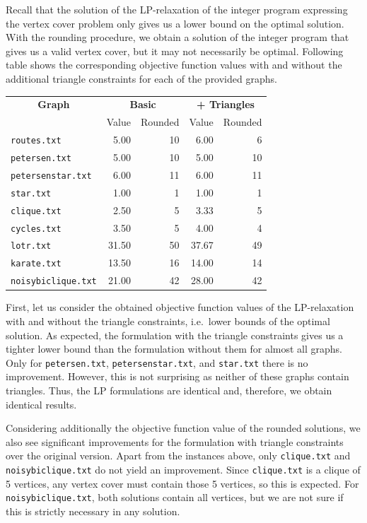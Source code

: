 \documentclass{article}
\begin{document}
Recall that the solution of the LP-relaxation of the integer program expressing the vertex cover problem only gives us a lower bound on the optimal solution. With the rounding procedure, we obtain a solution of the integer program that gives us a valid vertex cover, but it may not necessarily be optimal. Following table shows the corresponding objective function values with and without the additional triangle constraints for each of the provided graphs.

\begin{center}
    \begin{tabular}{l|r r|r r}
        \multicolumn{1}{c}{\textbf{Graph}} & \multicolumn{2}{|c|}{\textbf{Basic}} & \multicolumn{2}{c}{\textbf{+ Triangles}}\\
        & Value & Rounded & Value & Rounded\\
        \hline
        \lstinline|routes.txt| & 5.00 & 10 & 6.00 & 6\\
        \lstinline|petersen.txt| & 5.00 & 10 & 5.00 & 10\\
        \lstinline|petersenstar.txt| & 6.00 & 11 & 6.00 & 11\\
        \lstinline|star.txt| & 1.00 & 1 & 1.00 & 1\\
        \lstinline|clique.txt| & 2.50 & 5 & 3.33 & 5\\
        \lstinline|cycles.txt| & 3.50 & 5 & 4.00 & 4\\
        \lstinline|lotr.txt| & 31.50 & 50 & 37.67 & 49\\
        \lstinline|karate.txt| & 13.50 & 16 & 14.00 & 14\\
        \lstinline|noisybiclique.txt| & 21.00 & 42 & 28.00 & 42\\
    \end{tabular}
\end{center}

First, let us consider the obtained objective function values of the LP-relaxation with and without the triangle constraints, i.e.~lower bounds of the optimal solution. As expected, the formulation with the triangle constraints gives us a tighter lower bound than the formulation without them for almost all graphs. Only for \lstinline|petersen.txt|, \lstinline|petersenstar.txt|, and \lstinline|star.txt| there is no improvement. However, this is not surprising as neither of these graphs contain triangles. Thus, the LP formulations are identical and, therefore, we obtain identical results.

Considering additionally the objective function value of the rounded solutions, we also see significant improvements for the formulation with triangle constraints over the original version. Apart from the instances above, only \lstinline|clique.txt| and \lstinline|noisybiclique.txt| do not yield an improvement. Since \lstinline|clique.txt| is a clique of 5 vertices, any vertex cover must contain those 5 vertices, so this is expected. For \lstinline|noisybiclique.txt|, both solutions contain all vertices, but we are not sure if this is strictly necessary in any solution.
\end{document}
